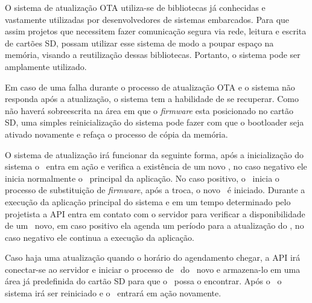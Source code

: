 O sistema de atualização OTA utiliza-se de bibliotecas já conhecidas e vastamente utilizadas por desenvolvedores de sistemas embarcados. Para que assim projetos que necessitem fazer comunicação segura via rede, leitura e escrita de cartões SD, possam utilizar esse sistema de modo a poupar espaço na memória, visando a reutilização dessas bibliotecas. Portanto, o sistema pode ser amplamente utilizado. 

Em caso de uma falha durante o processo de atualização OTA e o sistema não responda após a atualização, o sistema tem a habilidade de se recuperar. Como não haverá sobreescrita na área em que o \textit{firmware} esta posicionado no cartão SD, uma simples reinicialização do sistema pode fazer com que o bootloader seja ativado novamente e refaça o processo de cópia da memória.

O sistema de atualização irá funcionar da seguinte forma, após a inicialização do sistema o \bootloader\ entra em ação e verifica a existência de um novo \firmware, no caso negativo ele inicia normalmente o \software\ principal da aplicação. No caso positivo, o \bootloader\ inicia o processo de substituição de \textit{firmware}, após a troca, o novo \software\ é iniciado. Durante a execução da aplicação principal do sistema e em um tempo determinado pelo projetista a API entra em contato com o servidor para verificar a disponibilidade de um \software\ novo, em caso positivo ela agenda um período para a atualização do \firmware, no caso negativo ele continua a execução da aplicação. 

Caso haja uma atualização quando o horário do agendamento chegar, a API irá conectar-se ao servidor e iniciar o processo de \download\ do \firmware\ novo e armazena-lo em uma área já predefinida do cartão SD para que o \bootloader\ possa o encontrar. Após o \download\ o sistema irá ser reiniciado e o \bootloader\ entrará em ação novamente. 





